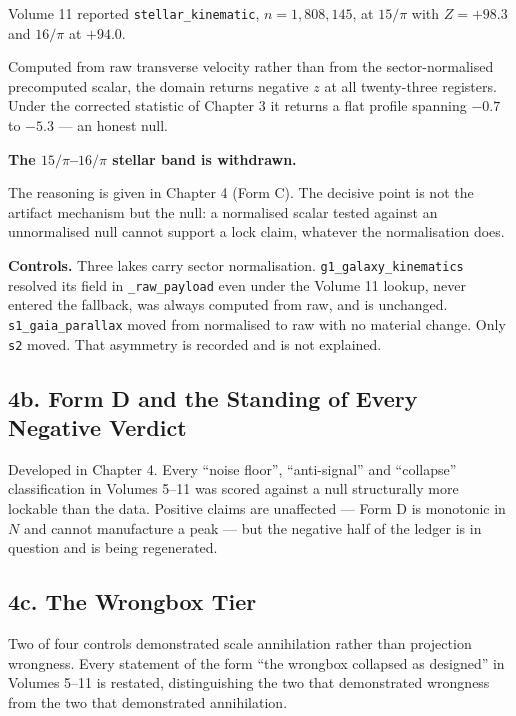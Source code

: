 \documentclass[11pt, letterpaper, openany]{book}
\begin{document}
\begin{erratumbox}
Volume 11 reported \texttt{stellar\_kinematic}, $n = 1{,}808{,}145$, at $15/\pi$ with
$Z = +98.3$ and $16/\pi$ at $+94.0$.

\medskip
Computed from raw transverse velocity rather than from the sector-normalised precomputed
scalar, the domain returns negative $z$ at all twenty-three registers. Under the corrected
statistic of Chapter 3 it returns a flat profile spanning $-0.7$ to $-5.3$ --- an honest null.

\medskip
\textbf{The $15/\pi$--$16/\pi$ stellar band is withdrawn.}
\end{erratumbox}

The reasoning is given in Chapter 4 (Form C). The decisive point is not the artifact mechanism
but the null: a normalised scalar tested against an unnormalised null cannot support a lock
claim, whatever the normalisation does.

\textbf{Controls.} Three lakes carry sector normalisation. \texttt{g1\_galaxy\_kinematics}
resolved its field in \texttt{\_raw\_payload} even under the Volume 11 lookup, never entered the
fallback, was always computed from raw, and is unchanged. \texttt{s1\_gaia\_parallax} moved from
normalised to raw with no material change. Only \texttt{s2} moved. That asymmetry is recorded
and is not explained.

\subsection{4b. Form D and the Standing of Every Negative Verdict}

Developed in Chapter 4. Every ``noise floor'', ``anti-signal'' and ``collapse'' classification
in Volumes 5--11 was scored against a null structurally more lockable than the data. Positive
claims are unaffected --- Form D is monotonic in $N$ and cannot manufacture a peak --- but the
negative half of the ledger is in question and is being regenerated.

\subsection{4c. The Wrongbox Tier}

Two of four controls demonstrated scale annihilation rather than projection wrongness.
Every statement of the form ``the wrongbox collapsed as designed'' in Volumes 5--11 is restated,
distinguishing the two that demonstrated wrongness from the two that demonstrated annihilation.
\end{document}
